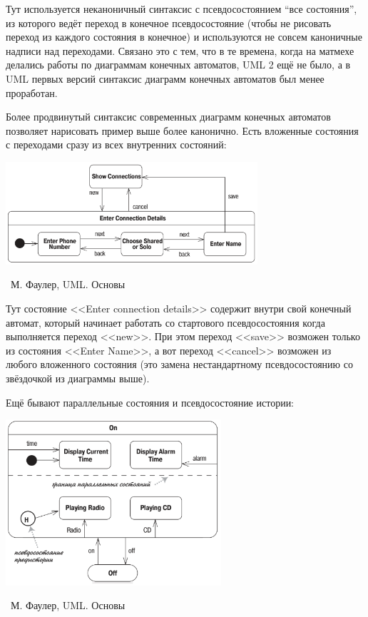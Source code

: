 \documentclass[a5paper]{article}
\newcommand{\attribution}[1] {
	\vspace{-5mm}\begin{flushright}\begin{scriptsize}%
	{\textcopyright\, #1}\end{scriptsize}\end{flushright}
}
\begin{document}
Тут используется неканоничный синтаксис с псевдосостоянием ``все состояния'', из которого ведёт переход в конечное псевдосостояние (чтобы не рисовать переход из каждого состояния в конечное) и используются не совсем каноничные надписи над переходами. Связано это с тем, что в те времена, когда на матмехе делались работы по диаграммам конечных автоматов, UML 2 ещё не было, а в UML первых версий синтаксис диаграмм конечных автоматов был менее проработан.

Более продвинутый синтаксис современных диаграмм конечных автоматов позволяет нарисовать пример выше более канонично. Есть вложенные состояния с переходами сразу из всех внутренних состояний:

\begin{center}
	\includegraphics[width=0.7\textwidth]{stateTransitionNestedStates.png}
	\attribution{М. Фаулер, UML. Основы}
\end{center}

Тут состояние <<Enter connection details>> содержит внутри свой конечный автомат, который начинает работать со стартового псевдосостояния когда выполняется переход <<new>>. При этом переход <<save>> возможен только из состояния <<Enter Name>>, а вот переход <<cancel>> возможен из любого вложенного состояния (это замена нестандартному псевдосостоянию со звёздочкой из диаграммы выше).

Ещё бывают параллельные состояния и псевдосостояние истории:

\begin{center}
	\includegraphics[width=0.6\textwidth]{stateTransitionParallelStates.png}
	\attribution{М. Фаулер, UML. Основы}
\end{center}
\end{document}
